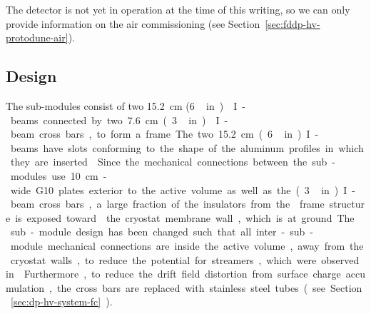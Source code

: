 The  detector is not yet in operation at the time of this writing, so we can only provide information on the air commissioning (see Section~\ref{sec:fddp-hv-protodune-air}).


\subsection{Design}
\label{sec:fddp-hv-protodune-lessons-design}

The   sub-modules consist of two \SI{15.2}{\cm} (\SI{6}\,in)  I-beams connected by two \SI{7.6}{\cm} (\SI{3}\,in)  I-beam cross bars, to form a frame. The two \SI{15.2}{\cm} (\SI{6}\,in) I-beams have slots conforming to the shape of the aluminum profiles in which they are inserted.  Since the mechanical connections between the sub-modules use \SI{10}{\cm}-wide G10 plates exterior to the active volume as well as the (\SI{3}\,in) I-beam cross bars, a large fraction of the insulators from the  frame structure is exposed toward  the cryostat membrane wall, which is at ground. 

The   sub-module design has been changed such that all inter-sub-module mechanical connections are inside the active volume, away from the cryostat walls, to reduce the potential for streamers, which were observed in . Furthermore, to reduce the drift field distortion from surface charge accumulation, the cross bars are replaced with stainless steel tubes (see  Section~\ref{sec:dp-hv-system-fc}).

